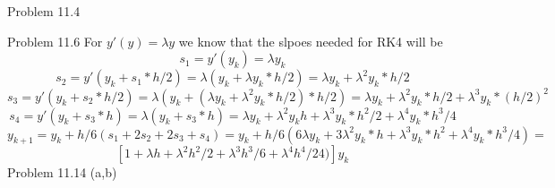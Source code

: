 \documentclass[12pt]{article}
\makeatletter
\theoremstyle{homework}
\newenvironment{exercise}[1]
{\def\@currentlabel{#1}\exercisecore}
{\endexercisecore}
\makeatother
\begin{document}
\begin{exercise}
6
Problem 11.4
\end{exercise}

\begin{exercise}
7
Problem 11.6
\end{exercise}
For $y'(y)=\lambda y$ we know that the slpoes needed for RK4 will be 
$$s_1=y'(y_k)=\lambda y_k$$
$$s_2=y'(y_k+s_1*h/2)=\lambda (y_k+\lambda y_k*h/2)=\lambda y_k+\lambda^2 y_k*h/2$$
$$s_3=y'(y_k+s_2*h/2)=\lambda (y_k+(\lambda y_k+\lambda^2 y_k*h/2)*h/2)=\lambda y_k+\lambda^2 y_k*h/2+\lambda^3 y_k*(h/2)^2$$
$$s_4=y'(y_k+s_3*h)=\lambda (y_k+s_3*h)=\lambda y_k+\lambda^2 y_kh+\lambda^3 y_k*h^2/2+\lambda^4 y_k*h^3/4$$
$$y_{k+1}=y_k+h/6(s_1+2s_2+2s_3+s_4)=y_k+h/6(6\lambda y_k+3\lambda^2 y_k*h+\lambda^3 y_k*h^2+\lambda^4 y_k*h^3/4)=$$
$$[1+\lambda h +\lambda^2 h^2/2+\lambda^3 h^3/6+\lambda^4 h^4/24)]y_k$$
\begin{exercise}
8
Problem 11.14 (a,b)
\end{exercise}
\end{document}
